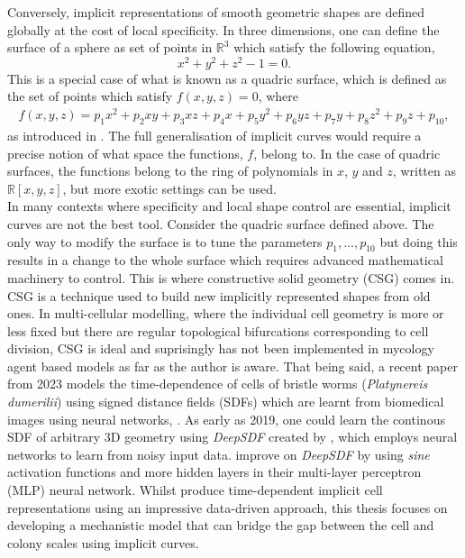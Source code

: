 Conversely, implicit representations of smooth geometric shapes are defined 
globally at the cost of local specificity. In three dimensions, one can 
define the surface of a sphere as set of points in $\mathbb{R}^3$ 
which satisfy the following equation,
\begin{equation*}
    x^2 + y^2 + z^2 - 1 = 0.
\end{equation*}
This is a special case of what is known as a quadric surface,
which is defined as the set of points which satisfy $f(x,y,z) =0$, where
\begin{equation*}
\begin{split}
    f(x,y,z) = p_1 x^2 + p_2 xy + p_3 xz + p_4 x + p_5 y^2 + p_6 yz + p_7 y + p_8 z^2 + p_9 z + p_{10},
\end{split}
\end{equation*}
as introduced in \cite{blinn1982generalization}. The full generalisation of 
implicit curves would require a precise notion of what space 
the functions, $f$, belong to. In the case of quadric surfaces, 
the functions belong to the ring of polynomials in $x$, $y$ and $z$, written as 
$\mathbb{R}[x,y,z]$, but more exotic settings can be used.
\\

In many contexts where specificity and local shape control are essential, 
implicit curves are not the best tool. Consider the quadric surface defined above.
The only way to modify the surface is to tune the parameters $p_1, ..., p_{10}$ but 
doing this results in a change to the whole surface which requires 
advanced mathematical machinery to control. This is where constructive solid geometry (CSG) comes 
in. 
\\

CSG is a technique used to build new implicitly represented shapes from old ones.
In multi-cellular modelling, where the individual cell geometry 
is more or less fixed but there 
are regular topological bifurcations corresponding to cell division,
CSG is ideal and suprisingly has not been implemented in mycology agent 
based models as far as the author is aware.
That being said, a recent paper from 2023 models the time-dependence of cells of bristle 
worms (\textit{Platynereis dumerilii}) using signed distance fields (SDFs) which 
are learnt from biomedical images using neural networks, \cite{wiesner2024generative}.
As early as 2019, one could learn the continous SDF of arbitrary 3D geometry using 
\textit{DeepSDF} created by \cite{park2019deepsdf}, which employs neural networks
to learn from noisy input data. \cite{wiesner2024generative} improve 
on \textit{DeepSDF} by using \textit{sine} activation functions and 
more hidden layers in their multi-layer perceptron (MLP) neural network. Whilst 
\cite{wiesner2024generative} produce time-dependent implicit cell representations using 
an impressive data-driven approach, this thesis focuses on developing 
a mechanistic model that can bridge the gap between the cell and colony scales using 
implicit curves.
\\

